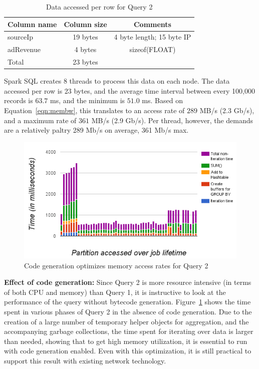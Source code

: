 \documentclass[9pt]{sig-alternate-05-2015}
\renewcommand{\paragraph}[1]{{\bf #1}}
\begin{document}
\begin{table}
\begin{tabular}[c]{|l|c|c|}
 \hline
 Column name & Column size & Comments \\
 \hline
 sourceIp & 19 bytes & 4 byte length; 15 byte IP \\ \hline
 adRevenue & 4 bytes & sizeof(FLOAT)\\
 \hline
 Total & 23 bytes & \\
 \hline
\end{tabular}
\caption{\label{tbl:data_query2}Data accessed per row for Query 2}
\end{table}

Spark SQL creates 8 threads to process this data on each node.  The data
accessed per row is 23 bytes, and the average time interval between every
100,000 records is $63.7$ ms, and the minimum is $51.0$ ms.  Based on
Equation~\ref{eqn:membw}, this translates to an access rate of $289$ MB/s (2.3
Gb/s), and a maximum rate of $361$ MB/s (2.9 Gb/s).  Per thread, however, the
demands are a relatively paltry 289 Mb/s on average, 361 Mb/s max.

\begin{figure}
\centering
\includegraphics[width=\columnwidth]{group-by-without-codegen}
\caption{\label{fig:codegen}Code generation optimizes memory access rates for Query 2}
\end{figure}

\paragraph{Effect of code generation:} Since Query 2 is more resource intensive
(in terms of both CPU and memory) than Query 1, it is instructive to look at
the performance of the query without bytecode generation.
Figure~\ref{fig:codegen} shows the time spent in various phases of Query 2 in
the absence of code generation. Due to the creation of a large number of
temporary helper objects for aggregation, and the accompanying garbage
collections, the time spent for iterating over data is larger than needed,
showing that to get high memory utilization, it is essential to run with code
generation enabled.  Even with this optimization, it is still practical to
support this result with existing network technology.
\end{document}
